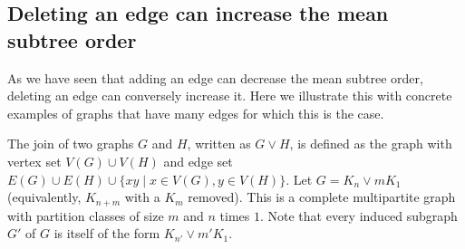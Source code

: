 \documentclass[11pt]{article}
\theoremstyle{definition}
\begin{document}
\subsection{Deleting an edge can increase the mean subtree order}\label{subsec:deletingedge}

As we have seen that adding an edge can decrease the mean subtree order, deleting an edge can conversely increase it. Here we illustrate this with concrete examples of graphs that have many edges for which this is the case.


The join of two graphs $G$ and $H$, written as $G \vee H$, is defined as the graph with vertex set $V(G) \cup V(H)$ and edge set $E(G) \cup E(H) \cup \{ xy \mid x \in V(G), y \in V(H) \}$. Let $G=K_n \vee m K_1$ (equivalently, $K_{n+m}$ with a $K_m$ removed).
This is a complete multipartite graph with partition classes of size $m$ and $n$ times $1$.
Note that every induced subgraph $G'$ of $G$ is itself of the form $K_{n'} \vee m' K_1.$



\end{document}
